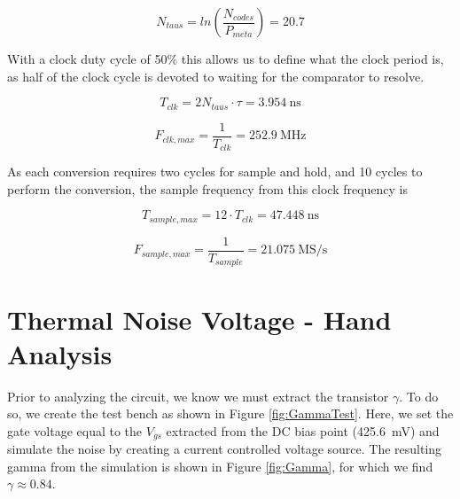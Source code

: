 \documentclass[letterpaper, notitlepage]{revtex4-1}
\begin{document}
  \begin{equation}
    N_{taus} = ln\left(\frac{N_{codes}}{P_{meta}}\right) = 20.7
  \end{equation}

  With a clock duty cycle of 50\% this allows us to define what the clock
  period is, as half of the clock cycle is devoted to waiting for the
  comparator to resolve.

  \begin{equation}
    T_{clk} = 2 N_{taus} \cdot \tau = \SI{3.954}{\nano\second}
  \end{equation}

  \begin{equation}
    F_{clk,max} = \frac{1}{T_{clk}} = \SI{252.9}{\mega\hertz}
  \end{equation}

  As each conversion requires two cycles for sample and hold, and 10 cycles
  to perform the conversion, the sample frequency from this clock frequency is

  \begin{equation}
      T_{sample,max} = 12 \cdot T_{clk} = \SI{47.448}{\nano\second}
  \end{equation}

  \begin{equation}
    F_{sample,max} = \frac{1}{T_{sample}} = \SI{21.075}{\mega\siemens\per\second}
  \end{equation}

\section{Thermal Noise Voltage - Hand Analysis}
Prior to analyzing the circuit, we know we must extract the transistor $\gamma$. To do so, we create the test bench as shown in Figure \ref{fig:GammaTest}. Here, we set the gate voltage equal to the $V_{gs}$ extracted from the DC bias point (\SI{425.6}{\milli\volt}) and simulate the noise by creating a current controlled voltage source. The resulting gamma from the simulation is shown in Figure \ref{fig:Gamma}, for which we find $\gamma\approx0.84$.
\end{document}
